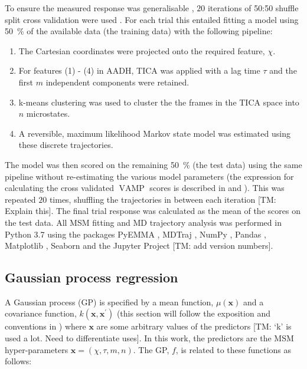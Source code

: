 To ensure the  measured response was generalisable \cite{friedman2001elements}, $20$ iterations of 50:50 shuffle split cross validation were used \cite{husicOptimizedParameterSelection2016}. For each trial this entailed fitting a model using \SI{50}{\percent} of the available data (the training data) with the following pipeline:

\begin{enumerate}
    \item \label{lst:modfititem1} The Cartesian coordinates were projected onto the required feature, $\chi$. 
    \item \label{lst:modfititem2} For features (1) - (4) in AADH, TICA was applied with a lag time $\tau$ and the first $m$ independent  components were retained. 
    \item \label{lst:modfititem3} k-means clustering \cite{friedman2001elements} was used to cluster the the frames in the TICA space into $n$ microstates.
    \item \label{lst:modfititem4} A reversible, maximum likelihood Markov state model was estimated using these discrete trajectories. 
\end{enumerate}

The model was then scored on the remaining \SI{50}{\percent} (the test data) using the same pipeline without re-estimating the various model parameters (the expression for calculating the cross validated $\operatorname{VAMP}$ scores is described in \cite{mcgibbonVariationalCrossvalidationSlow2015} and \cite{wuVariationalApproachLearning2019}). This was repeated $20$ times, shuffling the trajectories in between each iteration [TM: Explain this].  The final trial response was calculated as the mean of the scores on the test data. All MSM fitting and MD trajectory analysis was performed in Python 3.7 using the packages PyEMMA \cite{schererPyEMMASoftwarePackage2015a}, MDTraj \cite{mcgibbonMDTrajModernOpen2015}, NumPy \cite{waltNumPyArrayStructure2011}, Pandas \cite{mckinneyPandasFoundationalPython2011}, Matplotlib \cite{hunterMatplotlib2DGraphics2007},  Seaborn \cite{michaelwaskomMwaskomSeabornV02020} and the Jupyter Project \cite{kluyverJupyterNotebooksPublishing2016} [TM: add version numbers].

\subsection{Gaussian process regression}\label{subsec:gp}

A Gaussian process (GP) is specified by a mean function, $\mu(\mathbf{x})$ and a covariance function, $k(\mathbf{x}, \mathbf{x}^{\prime})$ (this section will follow the exposition and conventions in \cite{rasmussenGaussianProcessesMachine2006}) where $\mathbf{x}$ are some arbitrary values of the predictors [TM: `k' is used a lot. Need to differentiate uses]. In this work, the predictors are the MSM hyper-parameters $\mathbf{x} = (\chi, \tau, m, n)$. The GP, $f$, is related to these functions as follows: 

